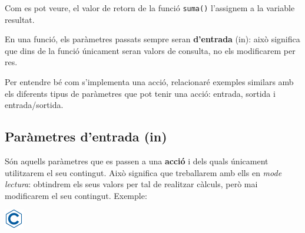 \documentclass[]{book}
\begin{document}
Com es pot veure, el valor de retorn de la funció \texttt{suma()} l'assignem a la variable resultat.

En una funció, els paràmetres passats sempre seran \textbf{d'entrada} (in): això significa que dins de la funció únicament seran valors de consulta, no els modificarem per res.

Per entendre bé com s'implementa una acció, relacionaré exemples similars amb els diferents tipus de paràmetres que pot tenir una acció: entrada, sortida i entrada/sortida.

\hypertarget{parametres-dentrada-in}{%
\subsection{Paràmetres d'entrada (in)}\label{parametres-dentrada-in}}

Són aquells paràmetres que es passen a una \textbf{acció} i dels quals únicament utilitzarem el seu contingut. Això significa que treballarem amb ells en \emph{mode lectura}: obtindrem els seus valors per tal de realitzar càlculs, però mai modificarem el seu contingut. Exemple:

\includegraphics{./img/c.png}
\end{document}
